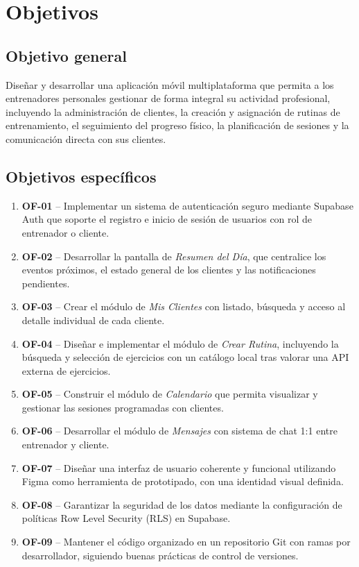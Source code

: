 \section{Objetivos}

\subsection{Objetivo general}

Diseñar y desarrollar una aplicación móvil multiplataforma que permita a los entrenadores personales gestionar de forma integral su actividad profesional, incluyendo la administración de clientes, la creación y asignación de rutinas de entrenamiento, el seguimiento del progreso físico, la planificación de sesiones y la comunicación directa con sus clientes.

\subsection{Objetivos específicos}

\begin{enumerate}
  \item \textbf{OF-01} -- Implementar un sistema de autenticación seguro mediante Supabase Auth que soporte el registro e inicio de sesión de usuarios con rol de entrenador o cliente.
  \item \textbf{OF-02} -- Desarrollar la pantalla de \textit{Resumen del Día}, que centralice los eventos próximos, el estado general de los clientes y las notificaciones pendientes.
  \item \textbf{OF-03} -- Crear el módulo de \textit{Mis Clientes} con listado, búsqueda y acceso al detalle individual de cada cliente.
  \item \textbf{OF-04} -- Diseñar e implementar el módulo de \textit{Crear Rutina}, incluyendo la búsqueda y selección de ejercicios con un catálogo local tras valorar una API externa de ejercicios.
  \item \textbf{OF-05} -- Construir el módulo de \textit{Calendario} que permita visualizar y gestionar las sesiones programadas con clientes.
  \item \textbf{OF-06} -- Desarrollar el módulo de \textit{Mensajes} con sistema de chat 1:1 entre entrenador y cliente.
  \item \textbf{OF-07} -- Diseñar una interfaz de usuario coherente y funcional utilizando Figma como herramienta de prototipado, con una identidad visual definida.
  \item \textbf{OF-08} -- Garantizar la seguridad de los datos mediante la configuración de políticas Row Level Security (RLS) en Supabase.
  \item \textbf{OF-09} -- Mantener el código organizado en un repositorio Git con ramas por desarrollador, siguiendo buenas prácticas de control de versiones.
\end{enumerate}


